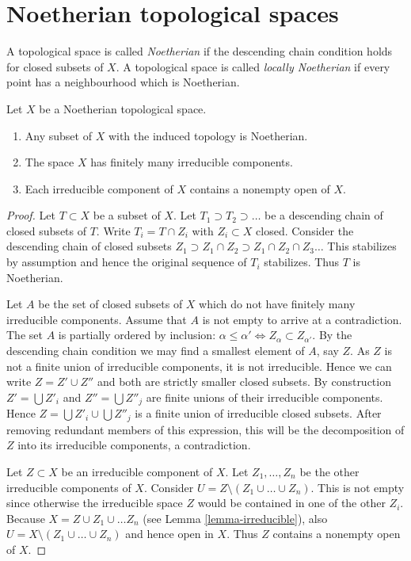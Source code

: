 \section{Noetherian topological spaces}
\label{section-noetherian}

\begin{definition}
\label{definition-noetherian}
A topological space is called {\it Noetherian}
if the descending chain condition holds for
closed subsets of $X$. A topological space is called
{\it locally Noetherian} if every point has a neighbourhood
which is Noetherian.
\end{definition}

\begin{lemma}
\label{lemma-Noetherian}
Let $X$ be a Noetherian topological space.
\begin{enumerate}
\item Any subset of $X$ with the induced topology is Noetherian.
\item The space $X$ has finitely many irreducible components.
\item Each irreducible component of $X$ contains a nonempty open of $X$.
\end{enumerate}
\end{lemma}

\begin{proof}
Let $T \subset X$ be a subset of $X$.
Let $T_1 \supset T_2 \supset \ldots$
be a descending chain of closed subsets of $T$.
Write $T_i =  T \cap Z_i$ with $Z_i \subset X$ closed.
Consider the descending chain of closed subsets
$Z_1 \supset Z_1\cap Z_2 \supset Z_1 \cap Z_2 \cap Z_3 \ldots$
This stabilizes by assumption and hence the original sequence
of $T_i$ stabilizes. Thus $T$ is Noetherian.

\medskip\noindent
Let $A$ be the set of closed subsets of $X$ which do not
have finitely many irreducible components. Assume that
$A$ is not empty to arrive at a contradiction.
The set $A$ is partially ordered by inclusion: $\alpha \leq \alpha'
\Leftrightarrow Z_{\alpha} \subset Z_{\alpha'}$.
By the descending chain condition we may find a
smallest element of $A$, say $Z$. As $Z$ is not a finite
union of irreducible components, it is not irreducible.
Hence we can write $Z = Z' \cup Z''$ and both are strictly smaller
closed subsets. By construction $Z' = \bigcup Z'_i$ and
$Z'' = \bigcup Z''_j$ are finite unions of their irreducible
components. Hence $Z = \bigcup Z'_i \cup \bigcup Z''_j$ is
a finite union of irreducible closed subsets.
After removing redundant members of this expression,
this will be the decomposition of $Z$ into its irreducible
components, a contradiction.

\medskip\noindent
Let $Z \subset X$ be an irreducible component of $X$.
Let $Z_1, \ldots, Z_n$ be the other irreducible components
of $X$. Consider $U = Z \setminus (Z_1\cup\ldots\cup Z_n)$.
This is not empty since otherwise the irreducible space
$Z$ would be contained in one of the other $Z_i$.
Because $X = Z \cup Z_1 \cup \ldots Z_n$ (see Lemma \ref{lemma-irreducible}),
also $U = X \setminus (Z_1\cup\ldots\cup Z_n)$
and hence open in $X$. Thus $Z$ contains a nonempty
open of $X$.
\end{proof}

